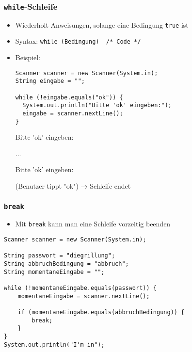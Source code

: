 \documentclass{../../presentation}
\begin{document}
\begin{frame}[fragile]
  \frametitle{\texttt{while}-Schleife}

  \begin{itemize}
    \item<1-> Wiederholt Anweisungen, solange eine Bedingung \texttt{true} ist    
    \item<1-> Syntax: \texttt{while (Bedingung) { /* Code */ }}
    \item<2-> Beispiel:
      \begin{verbatim}
Scanner scanner = new Scanner(System.in);
String eingabe = "";

while (!eingabe.equals("ok")) {
  System.out.println("Bitte 'ok' eingeben:");
  eingabe = scanner.nextLine();
}
      \end{verbatim}
      
      \begin{ausgabe}
Bitte 'ok' eingeben:

...

Bitte 'ok' eingeben:

(Benutzer tippt "ok") → Schleife endet

      \end{ausgabe}
    
      \end{itemize}

\end{frame}


\begin{frame}[fragile]
  \frametitle{\texttt{break}}

  \begin{itemize}
    \item Mit \texttt{break} kann man eine Schleife vorzeitig beenden
\end{itemize}

\begin{verbatim}
Scanner scanner = new Scanner(System.in);

String passwort = "diegrillung";
String abbruchBedingung = "abbruch";
String momentaneEingabe = "";

while (!momentaneEingabe.equals(passwort)) {
    momentaneEingabe = scanner.nextLine();

    if (momentaneEingabe.equals(abbruchBedingung)) {
        break;
    }
}
System.out.println("I'm in");
\end{verbatim}
\end{frame}
\end{document}
